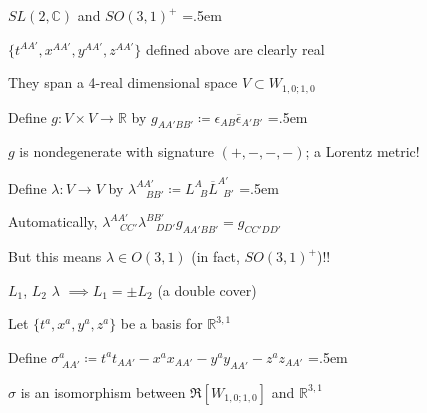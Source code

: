 \documentclass[xcolor={dvipsnames}]{beamer}
\let\olditemize=\itemize
\let\endolditemize=\enditemize
\renewenvironment{itemize}{\olditemize \itemsep=.5em }{\endolditemize}
\begin{document}
\begin{frame}{$SL(2, \mathbb{C})$ and $SO(3, 1)^+$}
    \begin{itemize}
        \item<1-> $\{t^{AA'}, x^{AA'}, y^{AA'}, z^{AA'}\}$ defined above are clearly real
        \item<2-> They span a 4-real dimensional space $V \subset W_{1,0;1,0}$
        \item<3-> Define $g:V\times V \rightarrow \mathbb{R}$ by $g_{AA'BB'} \coloneqq \epsilon_{AB}\overline{\epsilon}_{A'B'}$
        \begin{itemize}
            \item<4-> $g$ is nondegenerate with signature $(+, -, -, -)$; a Lorentz metric!
        \end{itemize}
        \item<5-> Define $\lambda: V \rightarrow V$ by $\lambda_{\quad BB'}^{AA'} \coloneqq L_{\;\;B}^A \overline{L}_{\;\;B'}^{A'}$
        \begin{itemize}
            \item<6-> Automatically, $\lambda_{\quad CC'}^{AA'}\lambda_{\quad DD'}^{BB'} g_{AA'BB'} = g_{CC'DD'}$
            \item<7-> But this means $\lambda \in O(3, 1)$ (in fact, $SO(3, 1)^+$)!!
            \item<8-> $L_1$, $L_2$ \textrightarrow\; $\lambda$ $\implies L_1 = \pm L_2$ (a double cover)
        \end{itemize}
        \item<9-> Let $\{t^a, x^a, y^a, z^a \}$ be a basis for $\mathbb{R}^{3,1}$
        \item<10-> Define $\sigma_{\;AA'}^a \coloneqq t^at_{AA'} - x^ax_{AA'} - y^ay_{AA'} - z^az_{AA'}$
        \begin{itemize}
            \item<11-> $\sigma$ is an isomorphism between $\Re[W_{1,0;1,0}]$ and $\mathbb{R}^{3,1}$
        \end{itemize}
    \end{itemize}
\end{frame}
\end{document}
